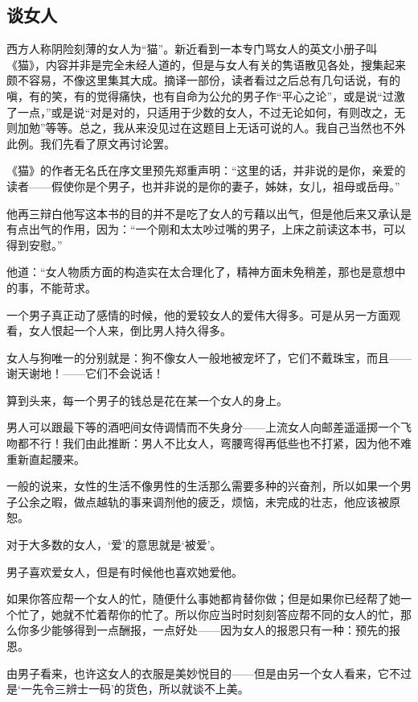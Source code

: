 \subsection{谈女人}

\par 西方人称阴险刻薄的女人为“猫”。新近看到一本专门骂女人的英文小册子叫《猫》，内容并非是完全未经人道的，但是与女人有关的隽语散见各处，搜集起来颇不容易，不像这里集其大成。摘译一部份，读者看过之后总有几句话说，有的嗔，有的笑，有的觉得痛快，也有自命为公允的男子作“平心之论”，或是说“过激了一点，”或是说“对是对的，只适用于少数的女人，不过无论如何，有则改之，无则加勉”等等。总之，我从来没见过在这题目上无话可说的人。我自己当然也不外此例。我们先看了原文再讨论罢。
\par 《猫》的作者无名氏在序文里预先郑重声明：“这里的话，并非说的是你，亲爱的读者——假使你是个男子，也并非说的是你的妻子，姊妹，女儿，祖母或岳母。”
\par 他再三辩白他写这本书的目的并不是吃了女人的亏藉以出气，但是他后来又承认是有点出气的作用，因为：“一个刚和太太吵过嘴的男子，上床之前读这本书，可以得到安慰。”
\par 他道：“女人物质方面的构造实在太合理化了，精神方面未免稍差，那也是意想中的事，不能苛求。
\par 一个男子真正动了感情的时候，他的爱较女人的爱伟大得多。可是从另一方面观看，女人恨起一个人来，倒比男人持久得多。
\par 女人与狗唯一的分别就是：狗不像女人一般地被宠坏了，它们不戴珠宝，而且——谢天谢地！——它们不会说话！
\par 算到头来，每一个男子的钱总是花在某一个女人的身上。
\par 男人可以跟最下等的酒吧间女侍调情而不失身分——上流女人向邮差遥遥掷一个飞吻都不行！我们由此推断：男人不比女人，弯腰弯得再低些也不打紧，因为他不难重新直起腰来。
\par 一般的说来，女性的生活不像男性的生活那么需要多种的兴奋剂，所以如果一个男子公余之暇，做点越轨的事来调剂他的疲乏，烦恼，未完成的壮志，他应该被原恕。
\par 对于大多数的女人，‘爱’的意思就是‘被爱’。
\par 男子喜欢爱女人，但是有时候他也喜欢她爱他。
\par 如果你答应帮一个女人的忙，随便什么事她都肯替你做；但是如果你已经帮了她一个忙了，她就不忙着帮你的忙了。所以你应当时时刻刻答应帮不同的女人的忙，那么你多少能够得到一点酬报，一点好处——因为女人的报恩只有一种：预先的报恩。
\par 由男子看来，也许这女人的衣服是美妙悦目的——但是由另一个女人看来，它不过是‘一先令三辨士一码’的货色，所以就谈不上美。
